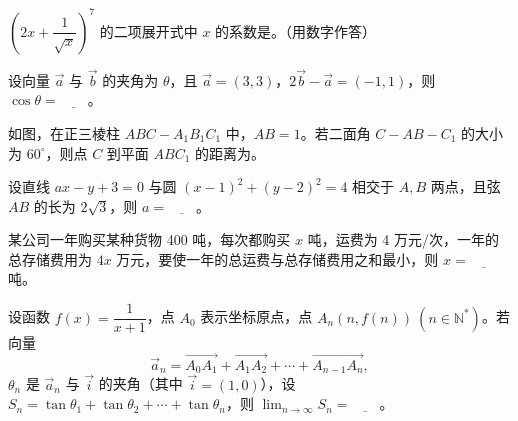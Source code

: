 \begin{question}

\(\left(2x+\dfrac1{\sqrt{x}}\right)^7\) 的二项展开式中 \(x\) 的系数是\gkblank{}。（用数字作答）

\end{question}
\begin{question}

设向量 \(\vec a\) 与 \(\vec b\) 的夹角为 \(\theta\)，且 \(\vec a=(3,3)\)，\(2\vec b-\vec a=(-1,1)\)，则 \(\cos\theta=\underline{\qquad}\)。

\Needspace{0.4\textheight}
\end{question}
\begin{question}

如图，在正三棱柱 \(ABC-A_1B_1C_1\) 中，\(AB=1\)。若二面角 \(C-AB-C_1\) 的大小为 \(60^\circ\)，则点 \(C\) 到平面 \(ABC_1\) 的距离为\gkblank{}。
\nopagebreak[4]
\begin{center}\end{center}
\nopagebreak[4]
\end{question}
\begin{question}

设直线 \(ax-y+3=0\) 与圆 \((x-1)^2+(y-2)^2=4\) 相交于 \(A,B\) 两点，且弦 \(AB\) 的长为 \(2\sqrt3\)，则 \(a=\underline{\qquad}\)。

\end{question}
\begin{question}

某公司一年购买某种货物 400 吨，每次都购买 \(x\) 吨，运费为 4 万元/次，一年的总存储费用为 \(4x\) 万元，要使一年的总运费与总存储费用之和最小，则 \(x=\underline{\qquad}\) 吨。

\end{question}
\begin{question}

设函数 \(f(x)=\dfrac1{x+1}\)，点 \(A_0\) 表示坐标原点，点 \(A_n(n,f(n))\ (n\in\mathbb N^*)\)。若向量
\nopagebreak[4]
\[
\vec a_n=\overrightarrow{A_0A_1}+\overrightarrow{A_1A_2}+\cdots+\overrightarrow{A_{n-1}A_n},
\]
\(\theta_n\) 是 \(\vec a_n\) 与 \(\vec i\) 的夹角（其中 \(\vec i=(1,0)\)），设 \(S_n=\tan\theta_1+\tan\theta_2+\cdots+\tan\theta_n\)，则 \(\displaystyle\lim_{n\to\infty}S_n=\underline{\qquad}\)。

\end{question}

